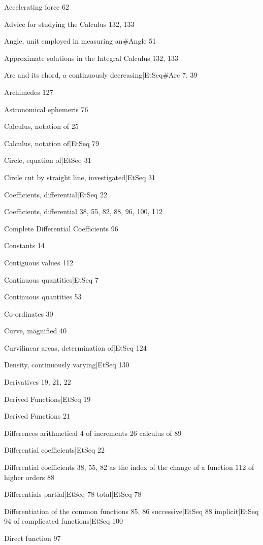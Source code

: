 \documentclass[12pt]{book}[2005/09/16]
\renewcommand{\(}{{\upshape(}}
\renewcommand{\)}{{\upshape)}}
\begin{document}
Accelerating force 62

Advice for studying the Calculus 132, 133

Angle, unit employed in measuring an#Angle 51

Approximate solutions in the Integral Calculus 132, 133

Arc and its chord, a continuously decreasing|EtSeq#Arc 7, 39 %

Archimedes 127

Astronomical ephemeris 76

Calculus, notation of 25

Calculus, notation of|EtSeq 79 %

Circle, equation of|EtSeq 31 %

Circle cut by straight line, investigated|EtSeq 31 %

Coefficients, differential|EtSeq 22 %

Coefficients, differential 38, 55, 82, 88, 96, 100, 112

Complete Differential Coefficients 96

Constants 14

Contiguous values 112

Continuous quantities|EtSeq 7 %

Continuous quantities 53

Co-ordinates 30

Curve, magnified 40

Curvilinear areas, determination of|EtSeq 124 %

Density, continuously varying|EtSeq 130 %

Derivatives 19, 21, 22

Derived Functions|EtSeq 19 %

Derived Functions 21

Differences
  arithmetical 4
  of increments 26
  calculus of 89

Differential coefficients|EtSeq 22 %

Differential coefficients 38, 55, 82
  as the index of the change of a function 112
  of higher orders 88

Differentials
  partial|EtSeq 78 %
  total|EtSeq 78 %

Differentiation
  of the common functions 85, 86
  successive|EtSeq 88 %
  implicit|EtSeq 94 %
  of complicated functions|EtSeq 100 %

Direct function 97
\end{document}
